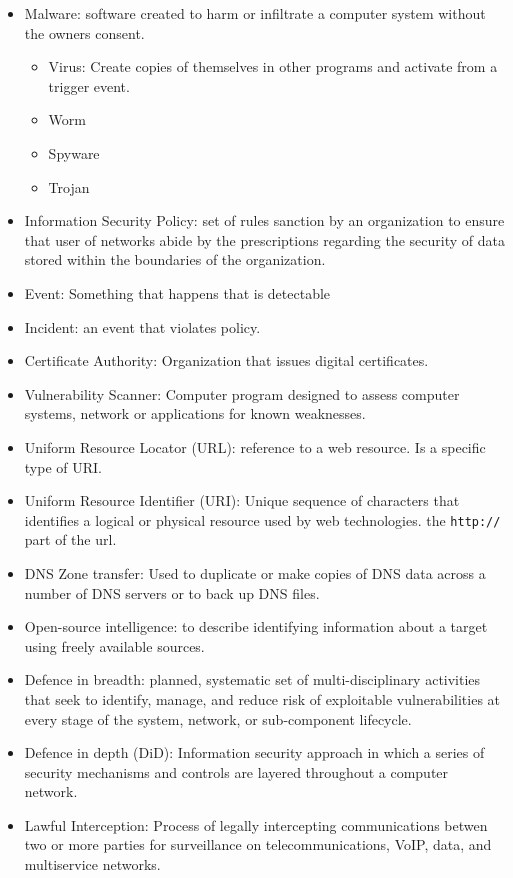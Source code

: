 \begin{itemize}
    \item Malware: software created to harm or infiltrate a computer system without the owners consent.
    \begin{itemize}
        \item Virus: Create copies of themselves in other programs and activate from a trigger event.
        \item Worm
        \item Spyware
        \item Trojan
    \end{itemize}
    \item Information Security Policy: set of rules sanction by an organization to ensure that user of networks abide by the prescriptions regarding the security of data stored within the boundaries of the organization.
    \item Event: Something that happens that is detectable
    \item Incident: an event that violates policy.
    \item Certificate Authority: Organization that issues digital certificates.
    \item Vulnerability Scanner: Computer program designed to assess computer systems, network or applications for known weaknesses.
    \item Uniform Resource Locator (URL): reference to a web resource. Is a specific type of URI.
    \item Uniform Resource Identifier (URI): Unique sequence of characters that identifies a logical or physical resource used by web technologies. the \verb|http://| part of the url.
    \item DNS Zone transfer: Used to duplicate or make copies of DNS data across a number of DNS servers or to back up DNS files.
    \item Open-source intelligence: to describe identifying information about a target using freely available sources.
    \item Defence in breadth: planned, systematic set of multi-disciplinary activities that seek to identify, manage, and reduce risk of exploitable vulnerabilities at every stage of the system, network, or sub-component lifecycle.
    \item Defence in depth (DiD): Information security approach in which a series of security mechanisms and controls are layered throughout a computer network.
    \item Lawful Interception: Process of legally intercepting communications betwen two or more parties for surveillance on telecommunications, VoIP, data, and multiservice networks.

\end{itemize}
